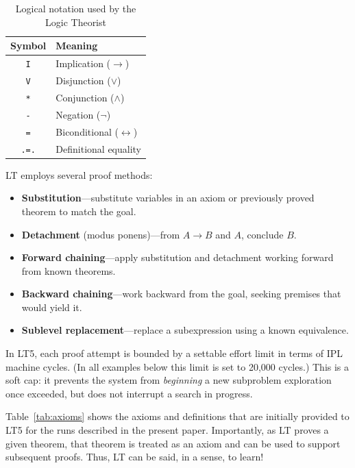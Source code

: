 \documentclass[journal]{IEEEtran}
\begin{document}
\begin{table}[h]
\centering
\caption{Logical notation used by the Logic Theorist}
\label{tab:notation}
\begin{tabular}{cl}
\toprule
\textbf{Symbol} & \textbf{Meaning} \\
\midrule
\texttt{I} & Implication ($\rightarrow$) \\
\texttt{V} & Disjunction ($\lor$) \\
\texttt{*} & Conjunction ($\land$) \\
\texttt{-} & Negation ($\lnot$) \\
\texttt{=} & Biconditional ($\leftrightarrow$) \\
\texttt{.=.} & Definitional equality \\
\bottomrule
\end{tabular}
\end{table}

LT employs several proof methods:

\begin{itemize}
\item \textbf{Substitution}---substitute variables in an axiom or
  previously proved theorem to match the goal.
\item \textbf{Detachment} (modus ponens)---from $A \rightarrow B$ and
  $A$, conclude $B$.
\item \textbf{Forward chaining}---apply substitution and detachment
  working forward from known theorems.
\item \textbf{Backward chaining}---work backward from the goal,
  seeking premises that would yield it.
\item \textbf{Sublevel replacement}---replace a subexpression using a
  known equivalence.
\end{itemize}

In LT5, each proof attempt is bounded by a settable effort limit in
terms of IPL machine cycles. (In all examples below this limit is set
to 20,000 cycles.) This is a soft cap: it prevents the system from
\textit{beginning} a new subproblem exploration once exceeded, but
does not interrupt a search in progress.

Table~\ref{tab:axioms} shows the axioms and definitions that are
initially provided to LT5 for the runs described in the present
paper. Importantly, as LT proves a given theorem, that theorem is
treated as an axiom and can be used to support subsequent proofs.
Thus, LT can be said, in a sense, to learn!
\end{document}
